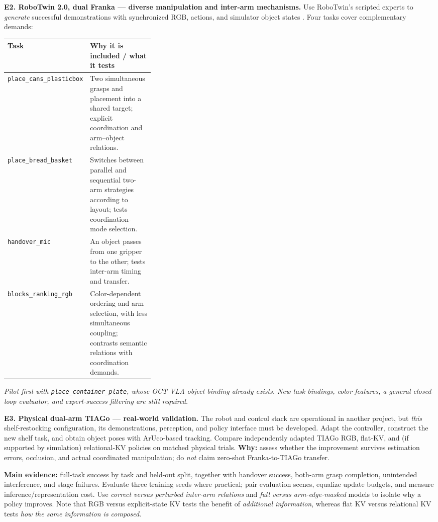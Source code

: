 \documentclass[11pt,a4paper]{article}
\newcommand{\sect}[1]{\vspace{5pt}{\noindent\large\bfseries\color{ink}#1}\par\vspace{-2pt}}
\newcommand{\status}[1]{{\color{muted}\textit{#1}}}
\begin{document}
\textbf{E2. RoboTwin 2.0, dual Franka --- diverse manipulation and inter-arm mechanisms.}
Use RoboTwin's scripted experts to \emph{generate} successful demonstrations with synchronized RGB, actions, and simulator object states \cite{chen2026robotwin}. Four tasks cover complementary demands:
\vspace{1pt}
\begin{center}
\small
\begin{tabularx}{\linewidth}{@{}>{\raggedright\arraybackslash}p{0.34\linewidth}X@{}}
\toprule
\textbf{Task} & \textbf{Why it is included / what it tests}\\
\midrule
\texttt{place\_cans\_plasticbox} & Two simultaneous grasps and placement into a shared target; explicit coordination and arm--object relations.\\
\texttt{place\_bread\_basket} & Switches between parallel and sequential two-arm strategies according to layout; tests coordination-mode selection.\\
\texttt{handover\_mic} & An object passes from one gripper to the other; tests inter-arm timing and transfer.\\
\texttt{blocks\_ranking\_rgb} & Color-dependent ordering and arm selection, with less simultaneous coupling; contrasts semantic relations with coordination demands.\\
\bottomrule
\end{tabularx}
\end{center}
\vspace{-4pt}
\status{Pilot first with \texttt{place\_container\_plate}, whose OCT-VLA object binding already exists. New task bindings, color features, a general closed-loop evaluator, and expert-success filtering are still required.}

\textbf{E3. Physical dual-arm TIAGo --- real-world validation.}
The robot and control stack are operational in another project, but \emph{this} shelf-restocking configuration, its demonstrations, perception, and policy interface must be developed. Adapt the controller, construct the new shelf task, and obtain object poses with ArUco-based tracking. Compare independently adapted TIAGo RGB, flat-KV, and (if supported by simulation) relational-KV policies on matched physical trials. \textbf{Why:} assess whether the improvement survives estimation errors, occlusion, and actual coordinated manipulation; do \emph{not} claim zero-shot Franka-to-TIAGo transfer.

\sect{Decisive experiments and intended contributions}
\textbf{Main evidence:} full-task success by task and held-out split, together with handover success, both-arm grasp completion, unintended interference, and stage failures. Evaluate three training seeds where practical; pair evaluation scenes, equalize update budgets, and measure inference/representation cost. Use \emph{correct versus perturbed inter-arm relations} and \emph{full versus arm-edge-masked} models to isolate why a policy improves. Note that RGB versus explicit-state KV tests the benefit of \emph{additional information}, whereas flat KV versus relational KV tests \emph{how the same information is composed}.
\end{document}
